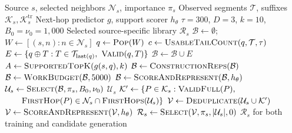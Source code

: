 \begin{algorithm}[t]
\caption{Evidence-guided Path Augmentation}
\label{alg:path_synthesis}
\footnotesize
\begin{algorithmic}[1]
\Require Source $s$, selected neighbors $\mathcal N_s$, importance $\pi_s$
\Require Observed segments $\mathcal T$, suffixes $\mathcal K_s,\mathcal K_s^{\mathrm{tr}}$
\Require Next-hop predictor $g$, support scorer $h_\theta$
\Require $\tau=300$, $D=3$, $k=10$, $B_0=\nu_0=1{,}000$
\Ensure Selected source-specific library $\mathcal R_s$
\State $\mathcal B\gets\emptyset$; $W\gets[(s,n):n\in\mathcal N_s]$
  \State $q\gets\Call{Pop}{W}$
  \State $c\gets\Call{UsableTailCount}{q,\mathcal T,\tau}$
  \State $E\gets\{q\oplus T:T\in\mathcal T_{\mathrm{last}(q)},\ \Call{Valid}{q,T}\}$
  \State $\mathcal B\gets\mathcal B\cup E$
    \State $A\gets\Call{SupportedTopK}{g(s,q),k}$
      \State {}
    \EndFor
  \EndIf
\EndWhile
\State $\mathcal B\gets\Call{ConstructionReps}{\mathcal B}$
\State $\mathcal B\gets\Call{WorkBudget}{\mathcal B,5000}$
\State {}
\State $\mathcal B\gets\Call{ScoreAndRepresent}{\mathcal B,h_\theta}$
\State $\mathcal U_s\gets\Call{Select}{\mathcal B,\pi_s,B_0,\nu_0}$
  \State \Return $\mathcal U_s$ 
\EndIf
\State $\mathcal K'\gets\{P\in\mathcal K_s:\Call{ValidFull}{P},$
\Statex \hspace{\algorithmicindent}$\qquad \Call{FirstHop}{P}\in\mathcal N_s\cap\Call{FirstHops}{\mathcal U_s}\}$
\State $\mathcal V\gets\Call{Deduplicate}{\mathcal U_s\cup\mathcal K'}$
\State {}
\State $\mathcal V\gets\Call{ScoreAndRepresent}{\mathcal V,h_\theta}$
\State $\mathcal R_s\gets\Call{Select}{\mathcal V,\pi_s,|\mathcal U_s|,0}$
\State \Return $\mathcal R_s$ for both training and candidate generation
\end{algorithmic}
\end{algorithm}
